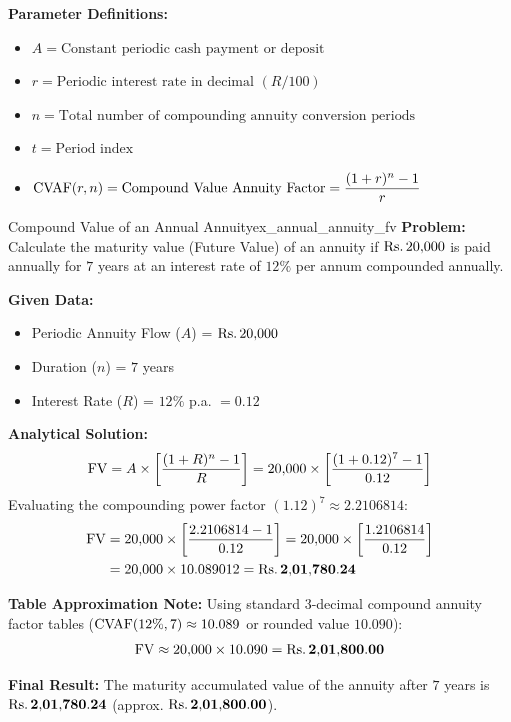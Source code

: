 \begin{formulabox}
\vspace{0.3em}
\textbf{Parameter Definitions:}
\begin{itemize}[noitemsep]
    \item $A = \text{Constant periodic cash payment or deposit}$
    \item $r = \text{Periodic interest rate in decimal } (R/100)$
    \item $n = \text{Total number of compounding annuity conversion periods}$
    \item $t = \text{Period index}$
    \item $\operatorname{CVAF}(r, n) = \text{Compound Value Annuity Factor} = \dfrac{(1+r)^n - 1}{r}$
\end{itemize}
\end{formulabox}

\begin{example}{Compound Value of an Annual Annuity}{ex_annual_annuity_fv}
\textbf{Problem:}
Calculate the maturity value (Future Value) of an annuity if $\text{Rs.}\, 20{,}000$ is paid annually for $7$ years at an interest rate of $12\%$ per annum compounded annually.

\tcbline
\textbf{Given Data:}
\begin{itemize}[noitemsep]
    \item Periodic Annuity Flow ($A$) = $\text{Rs.}\, 20{,}000$
    \item Duration ($n$) = $7$ years
    \item Interest Rate ($R$) = $12\%$ p.a. $= 0.12$
\end{itemize}

\textbf{Analytical Solution:}
\begin{equation*}
    \operatorname{FV} = A \times \left[ \frac{(1 + R)^n - 1}{R} \right] = 20{,}000 \times \left[ \frac{(1 + 0.12)^7 - 1}{0.12} \right]
\end{equation*}
Evaluating the compounding power factor $(1.12)^7 \approx 2.2106814$:
\begin{align*}
    \operatorname{FV} &= 20{,}000 \times \left[ \frac{2.2106814 - 1}{0.12} \right] = 20{,}000 \times \left[ \frac{1.2106814}{0.12} \right] \\
    &= 20{,}000 \times 10.089012 = \mathbf{\text{Rs.}\, 2{,}01{,}780.24}
\end{align*}

\textbf{Table Approximation Note:}
Using standard 3-decimal compound annuity factor tables ($\operatorname{CVAF}(12\%, 7) \approx 10.089$ or rounded value $10.090$):
\begin{equation*}
    \operatorname{FV} \approx 20{,}000 \times 10.090 = \mathbf{\text{Rs.}\, 2{,}01{,}800.00}
\end{equation*}

\textbf{Final Result:}
The maturity accumulated value of the annuity after $7$ years is $\mathbf{\text{Rs.}\, 2{,}01{,}780.24}$ (approx. $\mathbf{\text{Rs.}\, 2{,}01{,}800.00}$).
\end{example}


